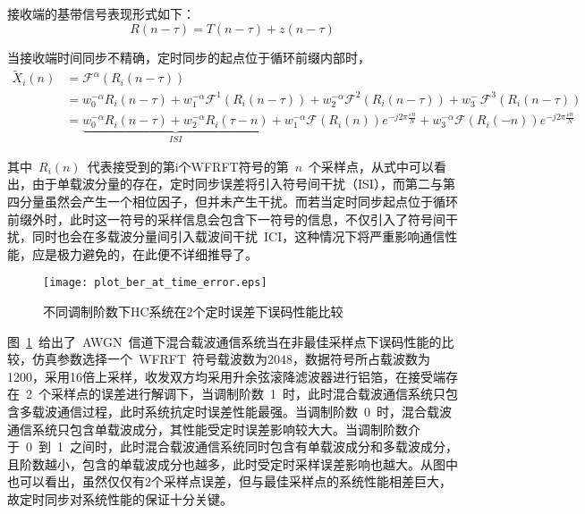 接收端的基带信号表现形式如下：
\begin{equation}
R(n-\tau) = T(n-\tau) + z(n-\tau)
\end{equation}

当接收端时间同步不精确，定时同步的起点位于循环前缀内部时，
\begin{align}\label{huajianjieguo}
\tilde X_i(n) &= {\mathcal{F}^\alpha }\left ( R_i\left ( n-\tau \right ) \right ) \\
&= w_0^{- \alpha }R_i(n-\tau) + w_1^{- \alpha }{{\mathcal{F}^1}\left ( R_i\left ( n-\tau \right ) \right )}
+ w_2^{- \alpha }{{\mathcal{F}^2}\left ( R_i\left ( n-\tau \right ) \right )}
+ w_3^{- \ }{{\mathcal{F}^3}\left ( R_i\left ( n-\tau \right ) \right )} \\
&= \underbrace {w_0^{- \alpha }R_i(n-\tau) + w_2^{- \alpha }R_i(\tau -n)}_{ISI} + w_1^{- \alpha }{{\mathcal{F}}\left ( R_i\left ( n \right ) \right )} {e^{-j2\pi \frac{{\varepsilon n}}{N}}} + w_3^{- \alpha }{{\mathcal{F}}\left ( R_i\left ( -n \right ) \right )} {e^{-j2\pi \frac{{\varepsilon n}}{N}}}
\end{align}

其中~$R_i(n)$~代表接受到的第i个WFRFT符号的第~$n$~个采样点，从式中可以看出，由于单载波分量的存在，定时同步误差将引入符号间干扰（ISI），而第二与第四分量虽然会产生一个相位因子，但并未产生干扰。而若当定时同步起点位于循环前缀外时，此时这一符号的采样信息会包含下一符号的信息，不仅引入了符号间干扰，同时也会在多载波分量间引入载波间干扰~ICI，这种情况下将严重影响通信性能，应是极力避免的，在此便不详细推导了。
\begin{figure}[htbp]
\centering
\texttt{[image: plot\_ber\_at\_time\_error.eps]}
\caption{不同调制阶数下HC系统在2个定时误差下误码性能比较}\vspace{-1em}\label{plot_ber_at_time_error}
\end{figure}
图~\ref{plot_ber_at_time_error}~给出了~AWGN~信道下混合载波通信系统当在非最佳采样点下误码性能的比较，仿真参数选择一个~WFRFT~符号载波数为2048，数据符号所占载波数为1200，采用16倍上采样，收发双方均采用升余弦滚降滤波器进行铝箔，在接受端存在~2~个采样点的误差进行解调下，当调制阶数~1~时，此时混合载波通信系统只包含多载波通信过程，此时系统抗定时误差性能最强。当调制阶数~0~时，混合载波通信系统只包含单载波成分，其性能受定时误差影响较大大。当调制阶数介于~0~到~1~之间时，此时混合载波通信系统同时包含有单载波成分和多载波成分，且阶数越小，包含的单载波成分也越多，此时受定时采样误差影响也越大。从图中也可以看出，虽然仅仅有2个采样点误差，但与最佳采样点的系统性能相差巨大，故定时同步对系统性能的保证十分关键。

